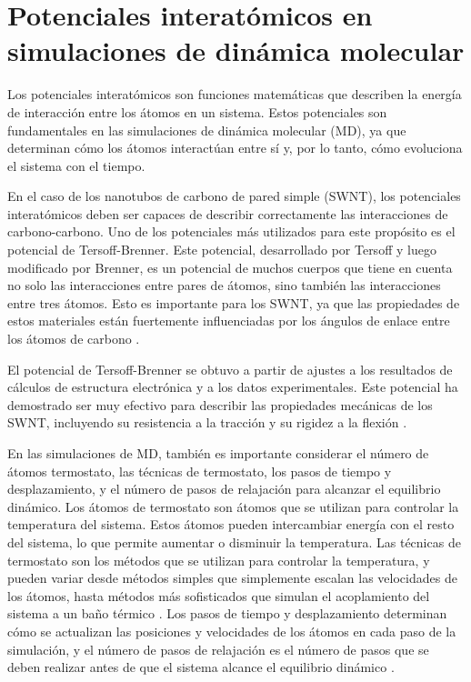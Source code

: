 \documentclass[a4paper]{article}
\begin{document}
\section{Potenciales interatómicos en simulaciones de dinámica molecular}
Los potenciales interatómicos son funciones matemáticas que describen la energía de interacción entre los átomos en un sistema. Estos potenciales son fundamentales en las simulaciones de dinámica molecular (MD), ya que determinan cómo los átomos interactúan entre sí y, por lo tanto, cómo evoluciona el sistema con el tiempo.

En el caso de los nanotubos de carbono de pared simple (SWNT), los potenciales interatómicos deben ser capaces de describir correctamente las interacciones de carbono-carbono. Uno de los potenciales más utilizados para este propósito es el potencial de Tersoff-Brenner. Este potencial, desarrollado por Tersoff y luego modificado por Brenner, es un potencial de muchos cuerpos que tiene en cuenta no solo las interacciones entre pares de átomos, sino también las interacciones entre tres átomos. Esto es importante para los SWNT, ya que las propiedades de estos materiales están fuertemente influenciadas por los ángulos de enlace entre los átomos de carbono \cite{tersoff1988empirical, brenner2002second}.

El potencial de Tersoff-Brenner se obtuvo a partir de ajustes a los resultados de cálculos de estructura electrónica y a los datos experimentales. Este potencial ha demostrado ser muy efectivo para describir las propiedades mecánicas de los SWNT, incluyendo su resistencia a la tracción y su rigidez a la flexión \cite{tersoff1988empirical, brenner2002second}.

En las simulaciones de MD, también es importante considerar el número de átomos termostato, las técnicas de termostato, los pasos de tiempo y desplazamiento, y el número de pasos de relajación para alcanzar el equilibrio dinámico. Los átomos de termostato son átomos que se utilizan para controlar la temperatura del sistema. Estos átomos pueden intercambiar energía con el resto del sistema, lo que permite aumentar o disminuir la temperatura. Las técnicas de termostato son los métodos que se utilizan para controlar la temperatura, y pueden variar desde métodos simples que simplemente escalan las velocidades de los átomos, hasta métodos más sofisticados que simulan el acoplamiento del sistema a un baño térmico \cite{frenkel2001understanding}. Los pasos de tiempo y desplazamiento determinan cómo se actualizan las posiciones y velocidades de los átomos en cada paso de la simulación, y el número de pasos de relajación es el número de pasos que se deben realizar antes de que el sistema alcance el equilibrio dinámico \cite{frenkel2001understanding}.
\end{document}
